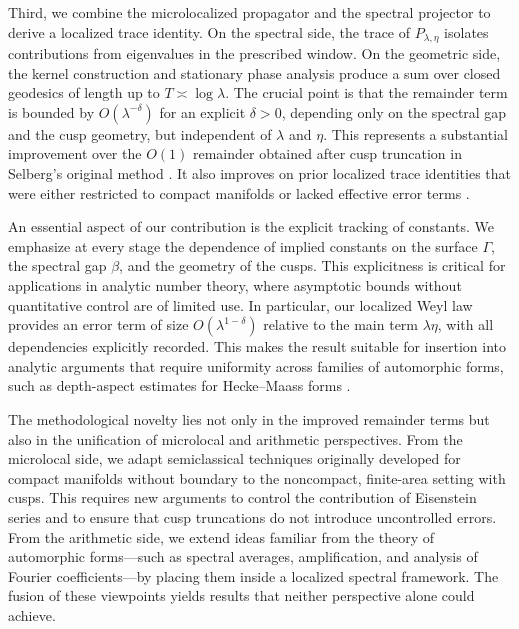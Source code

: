 Third, we combine the microlocalized propagator and the spectral projector to
derive a localized trace identity. On the spectral side, the trace of
$P_{\lambda,\eta}$ isolates contributions from eigenvalues in the prescribed
window. On the geometric side, the kernel construction and stationary phase
analysis produce a sum over closed geodesics of length up to $T \asymp \log
\lambda$. The crucial point is that the remainder term is bounded by
$O(\lambda^{-\delta})$ for an explicit $\delta>0$, depending only on the
spectral gap and the cusp geometry, but independent of $\lambda$ and $\eta$.
This represents a substantial improvement over the $O(1)$ remainder obtained
after cusp truncation in Selberg’s original method \cite{Selberg1956}. It also
improves on prior localized trace identities that were either restricted to
compact manifolds or lacked effective error terms
\cite{DG1975,Colin1978,Ivrii1980}.

An essential aspect of our contribution is the explicit tracking of constants.
We emphasize at every stage the dependence of implied constants on the surface
$\Gamma$, the spectral gap $\beta$, and the geometry of the cusps. This
explicitness is critical for applications in analytic number theory, where
asymptotic bounds without quantitative control are of limited use. In
particular, our localized Weyl law provides an error term of size
$O(\lambda^{1-\delta})$ relative to the main term $\lambda\eta$, with all
dependencies explicitly recorded. This makes the result suitable for insertion
into analytic arguments that require uniformity across families of automorphic
forms, such as depth-aspect estimates for Hecke–Maass forms
\cite{IwaniecSpectral,Sarnak2004,MichelVenkatesh2010}.

The methodological novelty lies not only in the improved remainder terms but
also in the unification of microlocal and arithmetic perspectives. From the
microlocal side, we adapt semiclassical techniques originally developed for
compact manifolds without boundary \cite{DG1975,Ivrii1980,ZworskiSemiclassical}
to the noncompact, finite-area setting with cusps. This requires new arguments
to control the contribution of Eisenstein series and to ensure that cusp
truncations do not introduce uncontrolled errors. From the arithmetic side, we
extend ideas familiar from the theory of automorphic forms—such as spectral
averages, amplification, and analysis of Fourier coefficients—by placing them
inside a localized spectral framework. The fusion of these viewpoints yields
results that neither perspective alone could achieve.

